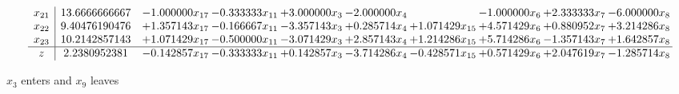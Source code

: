 \documentclass[10pt]{article}
\begin{document}
\[\begin{array}{c| c c@{\hskip 2pt} c@{\hskip 2pt} c@{\hskip 2pt} c@{\hskip 2pt} c@{\hskip 2pt} c@{\hskip 2pt} c@{\hskip 2pt} c@{\hskip 2pt} }
 x_{21}   &  13.6666666667 & -1.000000 x_{17} & -0.333333 x_{11} & + 3.000000 x_{3} & -2.000000 x_{4} &   & -1.000000 x_{6} & + 2.333333 x_{7} & -6.000000 x_{8}\\
 x_{22}   &  9.40476190476 & + 1.357143 x_{17} & -0.166667 x_{11} & -3.357143 x_{3} & + 0.285714 x_{4} & + 1.071429 x_{15} & + 4.571429 x_{6} & + 0.880952 x_{7} & + 3.214286 x_{8}\\
 x_{23}   &  10.2142857143 & + 1.071429 x_{17} & -0.500000 x_{11} & -3.071429 x_{3} & + 2.857143 x_{4} & + 1.214286 x_{15} & + 5.714286 x_{6} & -1.357143 x_{7} & + 1.642857 x_{8}\\
\hline
z    &  2.2380952381 & -0.142857 x_{17} & -0.333333 x_{11} & + 0.142857 x_{3} & -3.714286 x_{4} & -0.428571 x_{15} & + 0.571429 x_{6} & + 2.047619 x_{7} & -1.285714 x_{8}\\
\end{array}\]


 $ x_{3} $ enters and $ x_{9} $ leaves 
\end{document}
